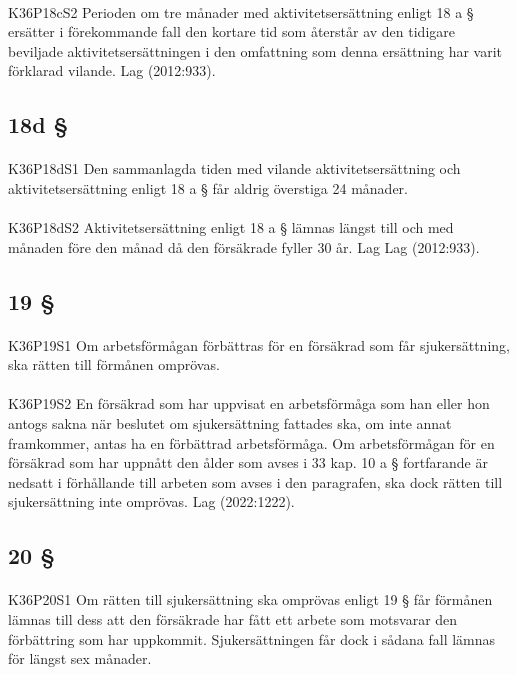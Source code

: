 \documentclass[a4paper,notitlepage,openany,10pt]{book}
\begin{document}
\paragraph*{}
{\tiny K36P18cS2}
Perioden om tre månader med aktivitetsersättning enligt 18 a § ersätter i förekommande fall den kortare tid som återstår av den tidigare beviljade aktivitetsersättningen i den omfattning som denna ersättning har varit förklarad vilande.
Lag (2012:933).
\subsection*{18d §}
\paragraph*{}
{\tiny K36P18dS1}
Den sammanlagda tiden med vilande aktivitetsersättning och aktivitetsersättning enligt 18 a § får aldrig överstiga 24 månader.
\paragraph*{}
{\tiny K36P18dS2}
Aktivitetsersättning enligt 18 a § lämnas längst till och med månaden före den månad då den försäkrade fyller 30 år.
Lag
Lag (2012:933).
\subsection*{19 §}
\paragraph*{}
{\tiny K36P19S1}
Om arbetsförmågan förbättras för en försäkrad som får sjukersättning, ska rätten till förmånen omprövas.
\paragraph*{}
{\tiny K36P19S2}
En försäkrad som har uppvisat en arbetsförmåga som han eller hon antogs sakna när beslutet om sjukersättning fattades ska, om inte annat framkommer, antas ha en förbättrad arbetsförmåga. Om arbetsförmågan för en försäkrad som har uppnått den ålder som avses i 33 kap. 10 a § fortfarande är nedsatt i förhållande till arbeten som avses i den paragrafen, ska dock rätten till sjukersättning inte omprövas.
Lag (2022:1222).
\subsection*{20 §}
\paragraph*{}
{\tiny K36P20S1}
Om rätten till sjukersättning ska omprövas enligt 19 § får förmånen lämnas till dess att den försäkrade har fått ett arbete som motsvarar den förbättring som har uppkommit.
Sjukersättningen får dock i sådana fall lämnas för längst sex månader.
\end{document}
